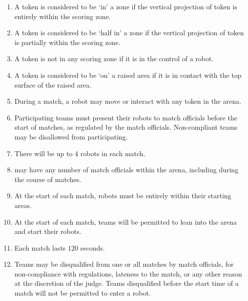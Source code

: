 \begin{enumerate}
\begin{enumerate}
    \end{enumerate}
  \item A token is considered to be `in' a zone if the vertical projection of token
        is entirely within the scoring zone.
  \item A token is considered to be `half in' a zone if the vertical projection of token
        is partially within the scoring zone.
  \item A token is not in any scoring zone if it is in the control of a robot.
  \item A token is considered to be `on' a raised area if it is in contact with
        the top surface of the raised area.
  \item During a match, a robot may move or interact with any token in the arena.
  \item Participating teams must present their robots to match officials before
        the start of matches, as regulated by the match officials. Non-compliant
        teams may be disallowed from participating.
  \item There will be up to 4 robots in each match.
  \item \org may have any number of match officials within the arena, including
        during the course of matches.
  \item At the start of each match, robots must be entirely within their
        starting areas.
  \item At the start of each match, teams will be permitted to lean into the
        arena and start their robots.
  \item Each match lasts $120$ seconds.
  \item Teams may be disqualified from one or all matches by match officials,
        for non-compliance with regulations, lateness to the match, or any other
        reason at the discretion of the judge. Teams disqualified before the
        start time of a match will not be permitted to enter a robot.
\end{enumerate}
